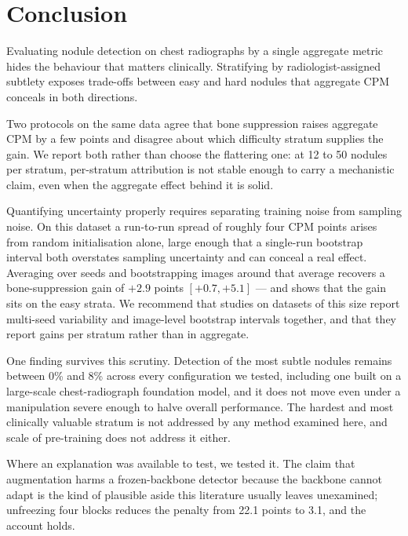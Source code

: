 \documentclass[11pt,a4paper]{article}
\begin{document}
\section{Conclusion}

Evaluating nodule detection on chest radiographs by a single aggregate metric
hides the behaviour that matters clinically. Stratifying by radiologist-assigned
subtlety exposes trade-offs between easy and hard nodules that aggregate CPM
conceals in both directions.

Two protocols on the same data agree that bone suppression raises aggregate CPM
by a few points and disagree about which difficulty stratum supplies the gain.
We report both rather than choose the flattering one: at 12 to 50 nodules per
stratum, per-stratum attribution is not stable enough to carry a mechanistic
claim, even when the aggregate effect behind it is solid.

Quantifying uncertainty properly requires separating training noise from
sampling noise. On this dataset a run-to-run spread of roughly four CPM points
arises from random initialisation alone, large enough that a single-run
bootstrap interval both overstates sampling uncertainty and can conceal a real
effect. Averaging over seeds and bootstrapping images around that average
recovers a bone-suppression gain of $+2.9$ points $[+0.7, +5.1]$ --- and shows
that the gain sits on the easy strata. We recommend that studies on datasets of
this size report multi-seed variability and image-level bootstrap intervals
together, and that they report gains per stratum rather than in aggregate.

One finding survives this scrutiny. Detection of the most subtle nodules
remains between 0\% and 8\% across every configuration we tested, including one
built on a large-scale chest-radiograph foundation model, and it does not move
even under a manipulation severe enough to halve overall performance. The
hardest and most clinically valuable stratum is not addressed by any method
examined here, and scale of pre-training does not address it either.

Where an explanation was available to test, we tested it. The claim that
augmentation harms a frozen-backbone detector because the backbone cannot adapt
is the kind of plausible aside this literature usually leaves unexamined;
unfreezing four blocks reduces the penalty from 22.1 points to 3.1, and the
account holds.

\end{document}
